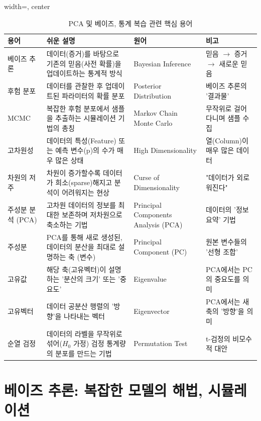 \documentclass[11pt,a4paper]{book}
\theoremstyle{definition}
\begin{document}
\begin{table}[h!]
\begin{adjustbox}{width=\textwidth, center}
\begin{tabular}{lp{6cm}p{4cm}l}
\toprule
\textbf{용어} & \textbf{쉬운 설명} & \textbf{원어} & \textbf{비고} \\
\midrule
베이즈 추론 & 데이터(증거)를 바탕으로 기존의 믿음(사전 확률)을 업데이트하는 통계적 방식 & Bayesian Inference & 믿음 $\rightarrow$ 증거 $\rightarrow$ 새로운 믿음 \\
후험 분포 & 데이터를 관찰한 후 업데이트된 파라미터의 확률 분포 & Posterior Distribution & 베이즈 추론의 '결과물' \\
MCMC & 복잡한 후험 분포에서 샘플을 추출하는 시뮬레이션 기법의 총칭 & Markov Chain Monte Carlo & 무작위로 걸어 다니며 샘플 수집 \\
고차원성 & 데이터의 특성(Feature) 또는 예측 변수(p)의 수가 매우 많은 상태 & High Dimensionality & 열(Column)이 매우 많은 데이터 \\
차원의 저주 & 차원이 증가할수록 데이터가 희소(sparse)해지고 분석이 어려워지는 현상 & Curse of Dimensionality & "데이터가 외로워진다" \\
주성분 분석 (PCA) & 고차원 데이터의 정보를 최대한 보존하며 저차원으로 축소하는 기법 & Principal Components Analysis (PCA) & 데이터의 '정보 요약' 기법 \\
주성분 & PCA를 통해 새로 생성된, 데이터의 분산을 최대로 설명하는 축 (변수) & Principal Component (PC) & 원본 변수들의 '선형 조합' \\
고유값 & 해당 축(고유벡터)이 설명하는 '분산의 크기' 또는 '중요도' & Eigenvalue & PCA에서는 PC의 중요도를 의미 \\
고유벡터 & 데이터 공분산 행렬의 '방향'을 나타내는 벡터 & Eigenvector & PCA에서는 새 축의 '방향'을 의미 \\
순열 검정 & 데이터의 라벨을 무작위로 섞어($H_0$ 가정) 검정 통계량의 분포를 만드는 기법 & Permutation Test & t-검정의 비모수적 대안 \\
\bottomrule
\end{tabular}
\end{adjustbox}
\caption{PCA 및 베이즈, 통계 복습 관련 핵심 용어}
\label{tab:terms}
\end{table}


\section{베이즈 추론: 복잡한 모델의 해법, 시뮬레이션}
\end{document}
